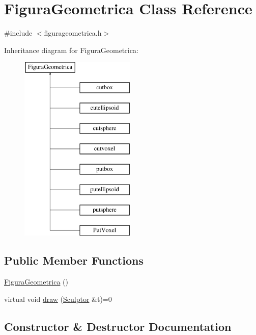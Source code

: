 \hypertarget{class_figura_geometrica}{}\section{Figura\+Geometrica Class Reference}
\label{class_figura_geometrica}


{\ttfamily \#include $<$figurageometrica.\+h$>$}

Inheritance diagram for Figura\+Geometrica\+:\begin{figure}[H]
\begin{center}
\leavevmode
\includegraphics[height=9.000000cm]{class_figura_geometrica}
\end{center}
\end{figure}
\subsection*{Public Member Functions}
\begin{DoxyCompactItemize}
\item 
\mbox{\hyperlink{class_figura_geometrica_a81d7c7efaea511e60a15f5a363138dd9}{Figura\+Geometrica}} ()
\item 
virtual void \mbox{\hyperlink{class_figura_geometrica_a34585fd7c0bd7378fc69c4ee208e676c}{draw}} (\mbox{\hyperlink{class_sculptor}{Sculptor}} \&t)=0
\end{DoxyCompactItemize}


\subsection{Constructor \& Destructor Documentation}
\mbox{\label{class_figura_geometrica_a81d7c7efaea511e60a15f5a363138dd9}} 
